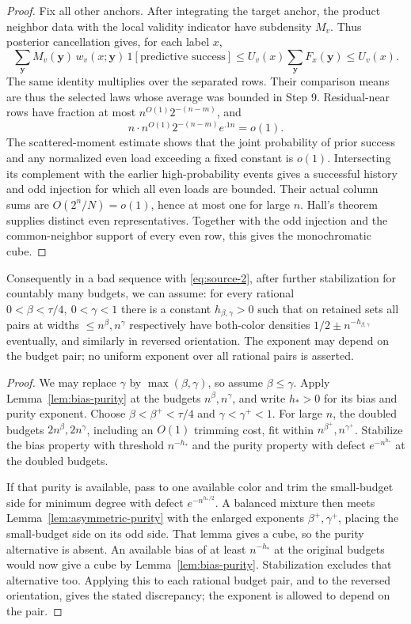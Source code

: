 \begin{proof}
Fix all other anchors. After integrating the target anchor, the product neighbor data with the local validity indicator have subdensity \(M_v\). Thus posterior cancellation gives, for each label \(x\),
\[
 \sum_{\boldsymbol y}
 M_v(\boldsymbol y)\,
 w_v(x;\boldsymbol y)\,
 1[\text{predictive success}]
 \le U_v(x)\sum_{\boldsymbol y}F_x(\boldsymbol y)
 \le U_v(x).
\]
The same identity multiplies over the separated rows. Their comparison means are thus the selected laws whose average was bounded in Step 9. Residual-near rows have fraction at most \(n^{O(1)}2^{-(n-m)}\), and
\[
 n\cdot n^{O(1)}2^{-(n-m)}e^{.1n}=o(1).
\]
The scattered-moment estimate shows that the joint probability of prior success and any normalized even load exceeding a fixed constant is \(o(1)\). Intersecting its complement with the earlier high-probability events gives a successful history and odd injection for which all even loads are bounded. Their actual column sums are \(O(2^n/N)=o(1)\), hence at most one for large \(n\). Hall's theorem supplies distinct even representatives. Together with the odd injection and the common-neighbor support of every even row, this gives the monochromatic cube.
\end{proof}

\begin{corollary}\label{cor:asymmetric-discrepancy}
Consequently in a bad sequence with \eqref{eq:source-2}, after further stabilization for countably many budgets, we can assume:
for every rational \(0<\beta<\tau/4,\ 0<\gamma<1\) there is a constant \(h_{\beta,\gamma}>0\) such that on retained sets all pairs at widths \(\le n^\beta,n^\gamma\) respectively have both-color densities \(1/2\pm n^{-h_{\beta,\gamma}}\) eventually, and similarly in reversed orientation. The exponent may depend on the budget pair; no uniform exponent over all rational pairs is asserted.
\end{corollary}

\begin{proof}
We may replace \(\gamma\) by \(\max(\beta,\gamma)\), so assume \(\beta\le\gamma\). Apply Lemma~\ref{lem:bias-purity} at the budgets \(n^\beta,n^\gamma\), and write \(h_*>0\) for its bias and purity exponent. Choose
\(\beta<\beta^+<\tau/4\) and \(\gamma<\gamma^+<1\).
For large \(n\), the doubled budgets \(2n^\beta,2n^\gamma\), including an \(O(1)\) trimming cost, fit within \(n^{\beta^+},n^{\gamma^+}\). Stabilize the bias property with threshold \(n^{-h_*}\) and the purity property with defect \(e^{-n^{h_*}}\) at the doubled budgets.

If that purity is available, pass to one available color and trim the small-budget side for minimum degree with defect \(e^{-n^{h_*/2}}\). A balanced mixture then meets Lemma~\ref{lem:asymmetric-purity} with the enlarged exponents \(\beta^+,\gamma^+\), placing the small-budget side on its odd side. That lemma gives a cube, so the purity alternative is absent. An available bias of at least \(n^{-h_*}\) at the original budgets would now give a cube by Lemma~\ref{lem:bias-purity}. Stabilization excludes that alternative too. Applying this to each rational budget pair, and to the reversed orientation, gives the stated discrepancy; the exponent is allowed to depend on the pair.
\end{proof}
